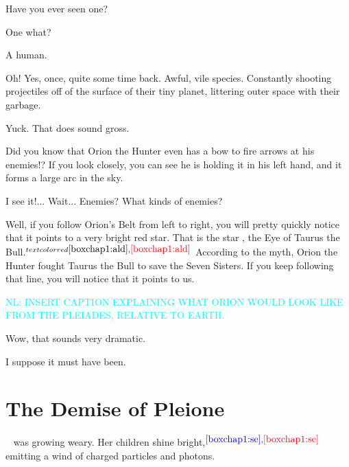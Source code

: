 \documentclass[main.tex]{subfiles}
\begin{document}
\par \Maia Have you ever seen one?

\par \Pleione One what?

\par \Maia A human.

\par \Pleione Oh!  Yes, once, quite some time back.  Awful, vile species.  Constantly shooting projectiles off of the surface of their tiny planet, littering outer space with their garbage.

\par \Maia Yuck.  That does sound gross.  

\par \Pleione Did you know that Orion the Hunter even has a bow to fire arrows at his enemies!?  If you look closely, you can see he is holding it in his left hand, and it forms a large arc in the sky.

\par \Maia I see it!... Wait... Enemies?  What kinds of enemies?

\par \Pleione Well, if you follow Orion's Belt from left to right, you will pretty quickly notice that it points to a very bright red star.  That is the star \rmaldebarran, the Eye of Taurus the Bull.$^{textcolor{red}{{\ref{boxchap1:ald}},\textcolor{red}{\ref{boxchap1:ald}}}}$  According to the myth, Orion the Hunter fought Taurus the Bull to save the Seven Sisters.  If you keep following that line, you will notice that it points to us.

\textcolor{cyan}{NL:  INSERT CAPTION EXPLAINING WHAT ORION WOULD LOOK LIKE FROM THE PLEIADES, RELATIVE TO EARTH.}

\par \Maia Wow, that sounds very dramatic.

\par \Pleione I suppose it must have been.

\section{The Demise of Pleione} \label{demise}

\par \nar \rmpleione~ was growing weary.  Her children shine bright,$^{\textcolor{blue}{{\ref{boxchap1:se}},\textcolor{red}{\ref{boxchap1:se}}}}$ emitting a wind of charged particles and photons.
\end{document}
